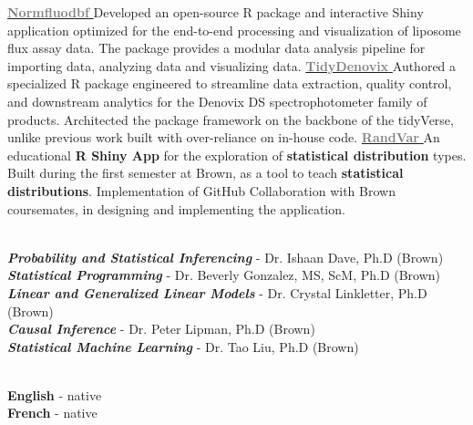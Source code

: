 \documentclass[9pt]{adeckcv} %
\begin{document}
\project
{\href{https://alphaprime7.github.io/normfluodbf/}{\textbf{ \textcolor{gray}{Normfluodbf}} }}
{}
{}
{}
{Developed an open-source R package and interactive Shiny application optimized for the end-to-end processing and visualization of liposome flux assay data.} 
{The package provides a modular data analysis pipeline for importing data, analyzing data and visualizing data.}
\project
{\href{https://alphaprime7.github.io/tidyDenovix/}{\textbf{ \textcolor{gray}{TidyDenovix}} }}
{}
{}
{}
{Authored a specialized R package engineered to streamline data extraction, quality control, and downstream analytics for the Denovix DS spectrophotometer family of products.}
{Architected the package framework on the backbone of the tidyVerse, unlike previous work built with over-reliance on in-house code.}
\project
{\href{https://alphaprime7.shinyapps.io/randvar/}{\textbf{ \textcolor{gray}{RandVar}} }}
{}
{}
{}
{An educational \textbf{R Shiny App} for the exploration of \textbf{statistical distribution} types. Built during the first semester at Brown, as a tool to teach \textbf{statistical distributions}.}
{Implementation of GitHub Collaboration with Brown coursemates, in designing and implementing the application.}


\begin{minipage}[t]{0.5\textwidth}
	\vspace{-\baselineskip}
	\\
	\textbf{\large{\textit{Probability and Statistical Inferencing}}} - Dr. Ishaan Dave, Ph.D (Brown) \\
  \textbf{\large{\textit{Statistical Programming}}} - Dr. Beverly Gonzalez, MS, ScM, Ph.D (Brown) \\
  \textbf{\large{\textit{Linear and Generalized Linear Models}}} - Dr. Crystal Linkletter, Ph.D (Brown) \\
  \textbf{\large{\textit{Causal Inference}}} - Dr. Peter Lipman, Ph.D (Brown) \\
  \textbf{\large{\textit{Statistical Machine Learning}}} - Dr. Tao Liu, Ph.D (Brown) \\

\end{minipage}
\hfill
\begin{minipage}[t]{0.3\textwidth}
	\vspace{-\baselineskip} %
	
	\\
	\textbf{English} - native\\
	\textbf{French} - native\\
\end{minipage}

\end{document}
